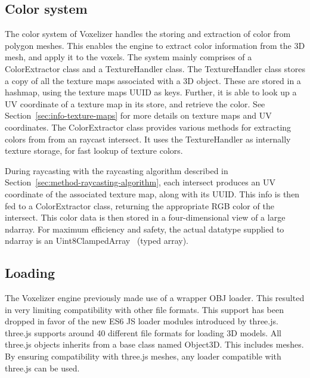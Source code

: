 \subsection{Color system}
The color system of Voxelizer handles the storing and extraction of color from polygon meshes. This enables the engine to extract color information from the 3D mesh, and apply it to the voxels. The system mainly comprises of a ColorExtractor class and a TextureHandler class. The TextureHandler class stores a copy of all the texture maps associated with a 3D object. These are stored in a hashmap, using the texture maps UUID as keys. Further, it is able to look up a UV coordinate of a texture map in its store, and retrieve the color. See Section~\ref{sec:info-texture-maps} for more details on texture maps and UV coordinates. The ColorExtractor class provides various methods for extracting colors from from an raycast intersect. It uses the TextureHandler as internally texture storage, for fast lookup of texture colors. 

During raycasting with the raycasting algorithm described in Section~\ref{sec:method-raycasting-algorithm}, each intersect produces an UV coordinate of the associated texture map, along with its UUID. This info is then fed to a ColorExtractor class, returning the appropriate RGB color of the intersect. This color data is then stored in a four-dimensional view of a large ndarray. For maximum efficiency and safety, the actual datatype supplied to ndarray is an Uint8ClampedArray~\cite{uint8clampedarray} (typed array).

\subsection{Loading}
The Voxelizer engine previously made use of a wrapper OBJ loader. This resulted in very limiting compatibility with other file formats. This support has been dropped in favor of the new ES6 JS loader modules introduced by three.js. three.js supports around 40 different file formats for loading 3D models. All three.js objects inherits from a base class named Object3D. This includes meshes. By ensuring compatibility with three.js meshes, any loader compatible with three.js can be used.

